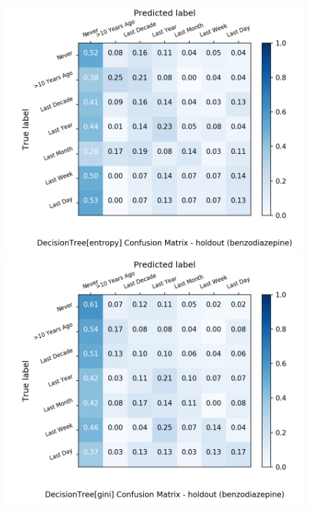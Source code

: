 \begin{figure}[H]
	\centering
	\begin{minipage}[b]{0.32\textwidth}
		\includegraphics[width=1.1\textwidth]{Plots/drugs/benzodiazepine_DecisionTree_entropy_balance_False_holdout.png}
	\end{minipage}
	\begin{minipage}[b]{0.32\textwidth}
		\includegraphics[width=1.1\textwidth]{Plots/drugs/benzodiazepine_DecisionTree_gini_balance_False_holdout.png}
	\end{minipage}

\end{figure}
